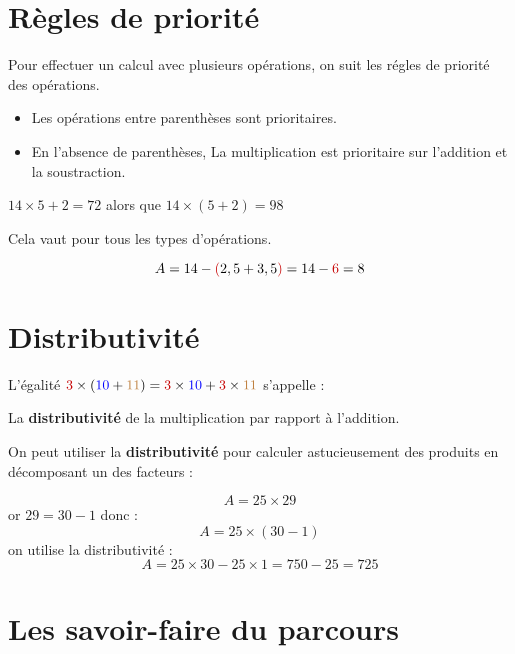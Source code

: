 \documentclass[a4paper,dvipsnames]{article}
\begin{document}
\section{Règles de priorité}

\begin{Def}
Pour effectuer un calcul avec plusieurs opérations, on suit les régles de priorité des opérations.
\begin{itemize}
\item Les opérations entre parenthèses sont prioritaires.
\item En l’absence de parenthèses, La multiplication est prioritaire sur l'addition et la soustraction.
\end{itemize}
\end{Def}

\begin{Ex}
$14\times5+2=72$ alors que $14\times(5+2)=98$
\end{Ex} 

\begin{Rq}
Cela vaut pour tous les types d'opérations.

\[A=14-\textcolor{red}{(}2,5+3,5\textcolor{red}{)}=14-\textcolor{red}{6}=8\]
\end{Rq}

\section{Distributivité}

\begin{Def}
L'égalité $\textcolor{red}{3}\times(\textcolor{blue}{10}+\textcolor{brown}{11})=\textcolor{red}{3}\times\textcolor{blue}{10}+\textcolor{red}{3}\times\textcolor{brown}{11}$ s'appelle :

La \textbf{distributivité} de la multiplication par rapport à l'addition.
\end{Def}

\begin{Mt}
On peut utiliser la \textbf{distributivité} pour calculer astucieusement des produits en décomposant un des facteurs :
\begin{Ex}
\[A=25\times29\]
or $29=30-1$ donc :
\[A=25\times(30-1)\]
on utilise la distributivité :
\[A=25\times30-25\times1=750-25=725\]
\end{Ex}
\end{Mt}

\section{Les savoir-faire du parcours}
\end{document}
